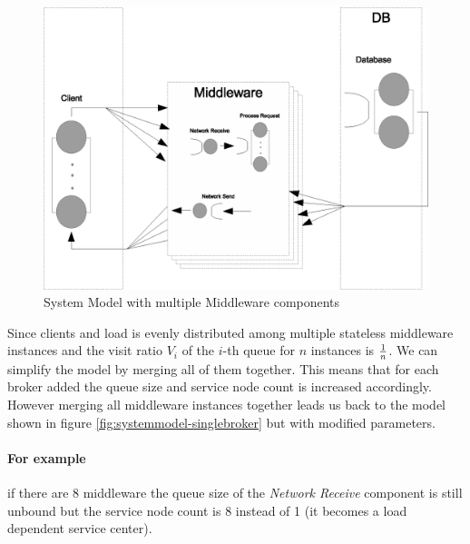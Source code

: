 \documentclass[a4paper]{article}
\begin{document}

\begin{figure}[H]
	\begin{center}
    \includegraphics[scale=0.6]{../drawings-ms2/systemmodel-multiplebroker.eps}
  \end{center}
  \caption{System Model with multiple Middleware components}
  \label{fig:systemmodel-multiplebroker}
\end{figure}


Since clients and load is evenly distributed among multiple stateless middleware instances and the visit ratio $V_i$ of the $i$-th queue for $n$ instances is $1 \over n$. We can simplify the model by merging all of them together. This means that for each broker added the queue size and service node count is increased accordingly. However merging all middleware instances together leads us back to the model shown in figure \ref{fig:systemmodel-singlebroker} but with modified parameters.

\paragraph{For example} if there are 8 middleware the queue size of the \textit{Network Receive} component is still unbound but the service node count is 8 instead of 1 (it becomes a load dependent service center).


\end{document}
